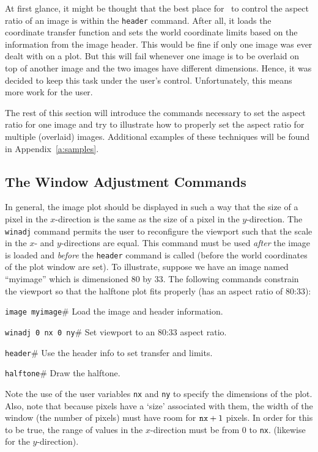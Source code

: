 At first glance, it might be thought that the best place for \wip\ to
control the aspect ratio of an image is within the
{\tt header}%
command.
After all, it loads the coordinate transfer function and sets the world
coordinate limits based on the information from the image header.
This would be fine if only one image was ever dealt with on a plot.
But this will fail whenever one image is to be overlaid on
top of another image and the two images have different dimensions.
Hence, it was decided to keep this task under the user's control.
Unfortunately, this means more work for the user.

The rest of this section will introduce the commands necessary to set
the aspect ratio for one image and try to illustrate how to properly
set the aspect ratio for multiple (overlaid) images.
Additional examples of these techniques will be found
in Appendix~\ref{a:samples}.

\subsection*		{The Window Adjustment Commands}

In general, the image plot should be displayed in such a way that
the size of a pixel in the $x$-direction is the same as the size
of a pixel in the $y$-direction.
The {\tt winadj}%
command permits the user to reconfigure the viewport such that the
scale in the $x$- and $y$-directions are equal.
This command must be used {\em after} the image is loaded and
{\em before} the
{\tt header}%
command is called (\ie before the world coordinates of the plot window are set).
To illustrate, suppose we have an image named ``myimage''
which is dimensioned 80 by 33.
The following commands constrain the viewport so that the halftone
plot fits properly (\ie has an aspect ratio of 80:33):
\begin{wiplist}%
  \item {\tt image myimage}\hfill\# Load the image and header information.
\samepage
  \item {\tt winadj 0 nx 0 ny}\hfill\# Set viewport to an 80:33 aspect ratio.
  \item {\tt header}\hfill\# Use the header info to set transfer and limits.
  \item {\tt halftone}\hfill\# Draw the halftone.
\end{wiplist}
Note the use of the user variables {\tt nx} and {\tt ny}
to specify the dimensions of the plot.
Also, note that because pixels have a `size' associated with them,
the width of the window (\ie the number of pixels)
must have room for $\mbox{\tt nx} + 1$ pixels.
In order for this to be true,
the range of values in the $x$-direction
must be from 0 to {\tt nx}.
(likewise for the $y$-direction).

